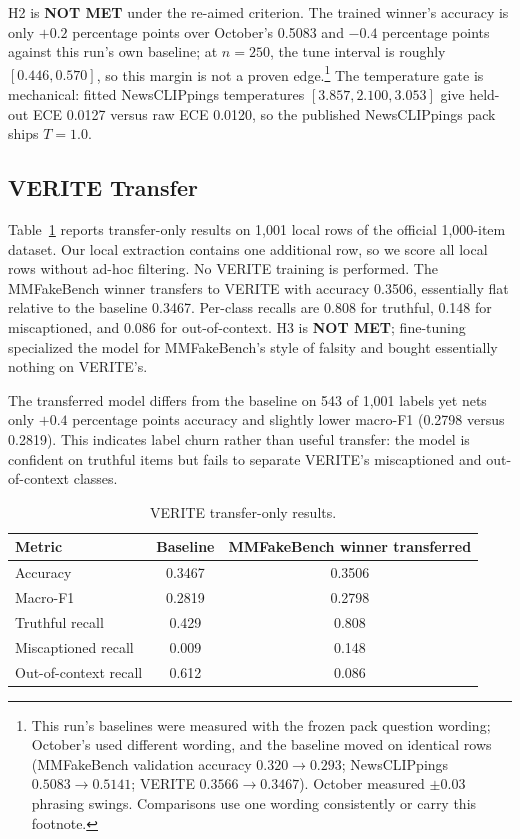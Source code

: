 \documentclass{article} %
\begin{document}
H2 is \textbf{NOT MET} under the re-aimed criterion. The trained winner's accuracy is only \(+0.2\) percentage points over October's 0.5083 and \(-0.4\) percentage points against this run's own baseline; at \(n=250\), the tune interval is roughly \([0.446, 0.570]\), so this margin is not a proven edge.\footnote{This run's baselines were measured with the frozen pack question wording; October's used different wording, and the baseline moved on identical rows (MMFakeBench validation accuracy \(0.320\rightarrow0.293\); NewsCLIPpings \(0.5083\rightarrow0.5141\); VERITE \(0.3566\rightarrow0.3467\)). October measured \(\pm0.03\) phrasing swings. Comparisons use one wording consistently or carry this footnote.} The temperature gate is mechanical: fitted NewsCLIPpings temperatures \([3.857, 2.100, 3.053]\) give held-out ECE 0.0127 versus raw ECE 0.0120, so the published NewsCLIPpings pack ships \(T=1.0\).

\subsection{VERITE Transfer}
Table~\ref{tab:verite} reports transfer-only results on 1,001 local rows of the official 1,000-item dataset. Our local extraction contains one additional row, so we score all local rows without ad-hoc filtering. No VERITE training is performed. The MMFakeBench winner transfers to VERITE with accuracy 0.3506, essentially flat relative to the baseline 0.3467. Per-class recalls are 0.808 for truthful, 0.148 for miscaptioned, and 0.086 for out-of-context. H3 is \textbf{NOT MET}; fine-tuning specialized the model for MMFakeBench's style of falsity and bought essentially nothing on VERITE's.

The transferred model differs from the baseline on 543 of 1,001 labels yet nets only \(+0.4\) percentage points accuracy and slightly lower macro-F1 (0.2798 versus 0.2819). This indicates label churn rather than useful transfer: the model is confident on truthful items but fails to separate VERITE's miscaptioned and out-of-context classes.

\begin{table}[t]
\centering
\small
\caption{VERITE transfer-only results.}
\label{tab:verite}
\begin{tabular}{lcc}
\toprule
Metric & Baseline & MMFakeBench winner transferred \\
\midrule
Accuracy & 0.3467 & 0.3506 \\
Macro-F1 & 0.2819 & 0.2798 \\
Truthful recall & 0.429 & 0.808 \\
Miscaptioned recall & 0.009 & 0.148 \\
Out-of-context recall & 0.612 & 0.086 \\
\bottomrule
\end{tabular}
\end{table}
\end{document}
